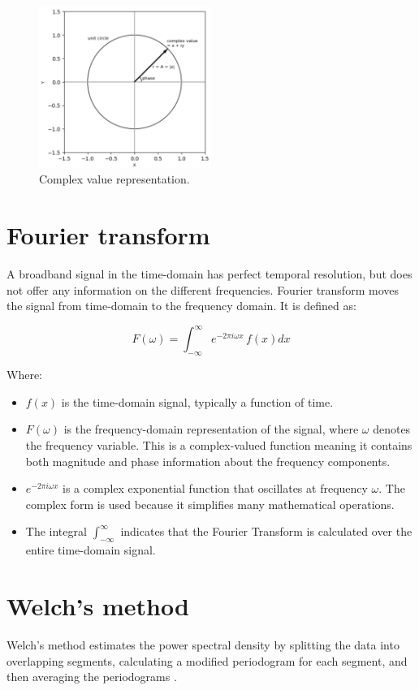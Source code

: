 \begin{figure}[h] 
    \centering
    \includegraphics[width=0.5\textwidth]{figures/chapter2/complex_value.png} 
    \caption{Complex value representation.}  
    \label{fig:complex_value} 
\end{figure}

\section{Fourier transform}

A broadband signal in the time-domain has perfect temporal resolution, but does not offer any information on the different frequencies. Fourier transform moves the signal from time-domain to the frequency domain. It is defined as:

$$
F(\omega) = \int_{-\infty}^{\infty} e^{-2 \pi i \omega x} \, f(x) dx
$$

Where:

\begin{itemize}
    \item $f(x)$ is the time-domain signal, typically a function of time.
    \item $F(\omega)$ is the frequency-domain representation of the signal, where $\omega$ denotes the frequency variable. This is a complex-valued function meaning it contains both magnitude and phase information about the frequency components.
    \item $e^{-2 \pi i \omega x}$ is a complex exponential function that oscillates at frequency $\omega$. The complex form is used because it simplifies many mathematical operations.
    \item The integral $\int_{-\infty}^{\infty}$ indicates that the Fourier Transform is calculated over the entire time-domain signal.
\end{itemize}


\section{Welch's method}
Welch's method estimates the power spectral density by splitting the data into overlapping segments, calculating a modified periodogram for each segment, and then averaging the periodograms \cite{welch1967use}.

